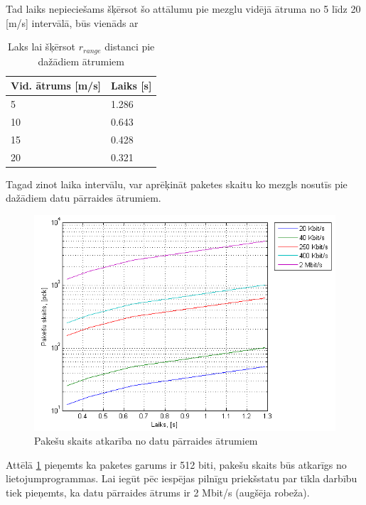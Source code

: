 Tad laiks nepieciešams šķērsot šo attālumu pie mezglu vidējā ātruma no 5 līdz 20 [m/s] intervālā, būs vienāds ar

\begin{table}[!htb]
\centering
\begin{tabular}{|l|l|}
\hline
Vid. ātrums [m/s]&Laiks [s]\\\hline
5&1.286\\
10&0.643\\
15&0.428\\
20&0.321\\\hline
\end{tabular}
\caption{Laks lai šķērsot $r_{range}$ distanci pie dažādiem ātrumiem}\label{tab:atrumi}
\end{table}

Tagad zinot laika intervālu, var aprēķināt paketes skaitu ko mezgls nosutīs pie dažādiem datu pārraides ātrumiem.
\begin{figure}[!htb]
\centering
\includegraphics[scale=0.7]{./graph/vpck.png}
\caption{Pakešu skaits atkarība no datu pārraides ātrumiem}\label{fig:speed}
\end{figure}
Attēlā \ref{fig:speed} pieņemts ka paketes garums ir 512 biti, pakešu skaits būs atkarīgs no lietojumprogrammas. Lai iegūt pēc iespējas pilnīgu priekšstatu par tīkla darbību tiek pieņemts, ka datu pārraides ātrums ir 2 Mbit/s (augšēja robeža).

